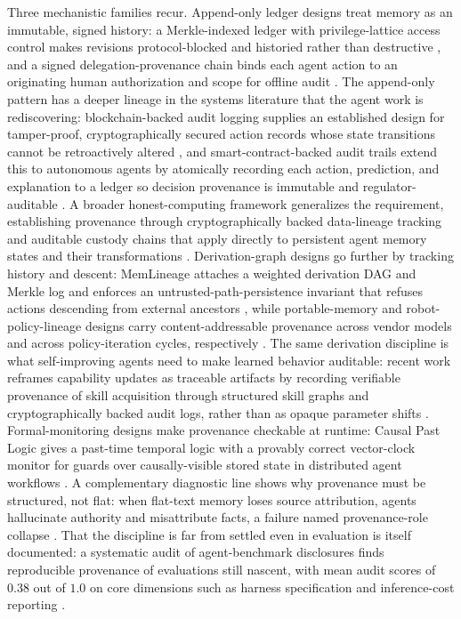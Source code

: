 Three mechanistic families recur. Append-only ledger designs treat memory as an immutable, signed history: a Merkle-indexed ledger with privilege-lattice access control makes revisions protocol-blocked and historied rather than destructive \citep{wright2025immutablemem}, and a signed delegation-provenance chain binds each agent action to an originating human authorization and scope for offline audit \citep{dalugoda2026hdp}. The append-only pattern has a deeper lineage in the systems literature that the agent work is rediscovering: blockchain-backed audit logging supplies an established design for tamper-proof, cryptographically secured action records whose state transitions cannot be retroactively altered \citep{ahmad2018blockaudit}, and smart-contract-backed audit trails extend this to autonomous agents by atomically recording each action, prediction, and explanation to a ledger so decision provenance is immutable and regulator-auditable \citep{wang2026auditor}. A broader honest-computing framework generalizes the requirement, establishing provenance through cryptographically backed data-lineage tracking and auditable custody chains that apply directly to persistent agent memory states and their transformations \citep{guitton2024honest}. Derivation-graph designs go further by tracking history and descent: MemLineage attaches a weighted derivation DAG and Merkle log and enforces an untrusted-path-persistence invariant that refuses actions descending from external ancestors \citep{ouyang2026memlineage}, while portable-memory and robot-policy-lineage designs carry content-addressable provenance across vendor models and across policy-iteration cycles, respectively \citep{ravindran2026portablemem,luo2026robolineage}. The same derivation discipline is what self-improving agents need to make learned behavior auditable: recent work reframes capability updates as traceable artifacts by recording verifiable provenance of skill acquisition through structured skill graphs and cryptographically backed audit logs, rather than as opaque parameter shifts \citep{huang2025audited}. Formal-monitoring designs make provenance checkable at runtime: Causal Past Logic gives a past-time temporal logic with a provably correct vector-clock monitor for guards over causally-visible stored state in distributed agent workflows \citep{bollig2026causalpast}. A complementary diagnostic line shows why provenance must be structured, not flat: when flat-text memory loses source attribution, agents hallucinate authority and misattribute facts, a failure named provenance-role collapse \citep{jin2026provenancerolecollapse}. That the discipline is far from settled even in evaluation is itself documented: a systematic audit of agent-benchmark disclosures finds reproducible provenance of evaluations still nascent, with mean audit scores of $0.38$ out of $1.0$ on core dimensions such as harness specification and inference-cost reporting \citep{moghadasi2026audit}.


